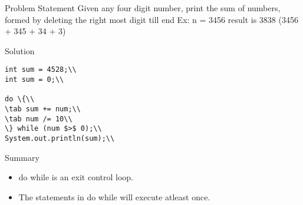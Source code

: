 \documentclass[aspectratio=169,14pt,usenames,dvipsnames]{beamer}
\newcommand\tab[1][1cm]{\hspace*{#1}}
\begin{document}
\begin{frame}{Problem Statement}
Given any four digit number, print the sum of
numbers, formed by deleting the right most
digit till end
Ex: n = 3456 result is 3838 (3456 + 345 + 34 +
3)
\end{frame}

\begin{frame}{Solution}
\begin{lstlisting}
int sum = 4528;\\
int sum = 0;\\

do \{\\
\tab sum += num;\\
\tab num /= 10\\
\} while (num $>$ 0);\\
System.out.println(sum);\\
\end{lstlisting}
\end{frame}


\begin{frame}{Summary}
\begin{itemize}
    \item do while is an exit control loop.
\item The statements in do while will execute
atleast once.

\end{itemize}
\end{frame}
\end{document}

